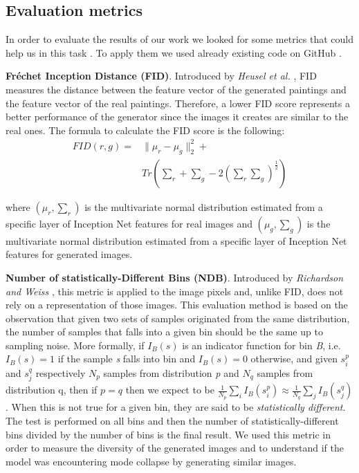 \documentclass[10pt,twocolumn,letterpaper]{article}
\begin{document}
\subsection{Evaluation metrics}
In order to evaluate the results of our work we looked for some metrics that could help us in this task \cite{metrics}. To apply them we used already existing code on GitHub \cite{metricsRepo}.

\textbf{Fréchet Inception Distance (FID)}. Introduced by \textit{Heusel et al.} \cite{fid}, FID measures the distance between the feature vector of the generated paintings and the feature vector of the real paintings. Therefore, a lower FID score represents a better performance of the generator since the images it creates are similar to the real ones. The formula to calculate the FID score is the following:
\begin{equation}
	\begin{split}
		\textstyle FID(r, g) = & \| \mu_{r} - \mu_{g} \| _{2}^{2} + \\ 
			& \textstyle Tr(\sum_{r} +  \sum_{g} - 2(\sum_{r}\sum_{g})^\frac{1}{2})
	\end{split}
\end{equation}
 
where $\textstyle (\mu_{r} , \sum_{r})$ is the multivariate normal distribution estimated from a specific layer of Inception Net features for real images and $\textstyle (\mu_{g} , \sum_{g})$ is the multivariate normal distribution estimated from a specific layer of Inception Net features for generated images. 

\textbf{Number of statistically-Different Bins (NDB)}. Introduced by \textit{Richardson and Weiss} \cite{ndb}, this metric is applied to the image pixels and, unlike FID, does not rely on a representation of those images. This evaluation method is based on the observation that given two sets of samples originated from the same distribution, the number of samples that falls into a given bin should be the same up to sampling noise. More formally, if $I_{B}(s)$ is an indicator function for bin \textit{B}, i.e. $I_{B}(s)=1$ if the sample \textit{s} falls into bin  and $I_{B}(s)=0$ otherwise, and given ${s_{i}^{p}}$ and ${s_{j}^{q}}$ respectively ${N_{p}}$ samples from distribution \textit{p} and ${N_{q}}$ samples from distribution q, then if $p=q$ then we expect to be $\textstyle \frac{1}{N_p}\sum_{i}{I_B(s_{i}^{p})} \approx \frac{1}{N_q}\sum_{j}{I_B(s_{j}^{q})} $. When this is not true for a given bin, they are said to be \textit{statistically different}. The test is performed on all bins and then the number of statistically-different bins divided by the number of bins is the final result. We used this metric in order to measure the diversity of the generated images and to understand if the model was encountering mode collapse by generating similar images. 
\end{document}
